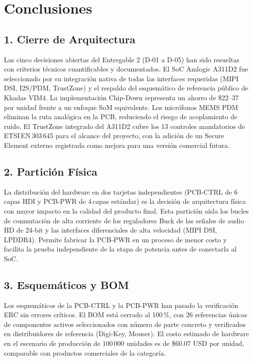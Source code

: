 \chapter{Conclusiones}
\label{chap:conclusiones}

\section{1. Cierre de Arquitectura}

Las cinco decisiones abiertas del Entregable 2 (D-01 a D-05) han sido resueltas con criterios técnicos cuantificables y documentados. El SoC Amlogic A311D2 fue seleccionado por su integración nativa de todas las interfaces requeridas (MIPI DSI, I2S/PDM, TrustZone) y el respaldo del esquemático de referencia público de Khadas VIM4. La implementación Chip-Down representa un ahorro de \$22--37 por unidad frente a un enfoque SoM equivalente. Los micrófonos MEMS PDM eliminan la ruta analógica en la PCB, reduciendo el riesgo de acoplamiento de ruido. El TrustZone integrado del A311D2 cubre los 13 controles mandatorios de ETSI\,EN\,303\,645 para el alcance del proyecto, con la adición de un Secure Element externo registrada como mejora para una versión comercial futura.

\section{2. Partición Física}

La distribución del hardware en dos tarjetas independientes (PCB-CTRL de 6\,capas HDI y PCB-PWR de 4\,capas estándar) es la decisión de arquitectura física con mayor impacto en la calidad del producto final. Esta partición aísla los bucles de conmutación de alta corriente de los reguladores Buck de las señales de audio HD de 24-bit y las interfaces diferenciales de alta velocidad (MIPI DSI, LPDDR4). Permite fabricar la PCB-PWR en un proceso de menor costo y facilita la prueba independiente de la etapa de potencia antes de conectarla al SoC.

\section{3. Esquemáticos y BOM}

Los esquemáticos de la PCB-CTRL y la PCB-PWR han pasado la verificación ERC sin errores críticos. El BOM está cerrado al 100\,\%, con 26 referencias únicas de componentes activos seleccionados con número de parte concreto y verificados en distribuidores de referencia (Digi-Key, Mouser). El costo estimado de hardware en el escenario de producción de 100\,000 unidades es de \$60.07 USD por unidad, comparable con productos comerciales de la categoría.

